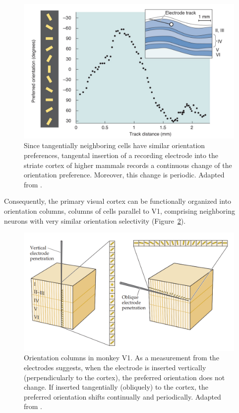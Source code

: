 \begin{figure}[H]\centering
	\includegraphics[width=140mm]{../img/tangengal_electrode_orientation.png}
	\caption{Since tangentially neighboring cells have similar orientation preferences, tangental insertion of a recording electrode into the striate cortex of higher mammals records a continuous change of the orientation preference. Moreover, this change is periodic. Adapted from \citep{bear2020neuroscience}.}
	\label{img_periodic_orientation}
\end{figure}


Consequently, the primary visual cortex can be functionally organized into orientation columns, columns of cells parallel to V1, comprising neighboring neurons with very similar orientation selectivity (Figure~\ref{ori_columns}).


\begin{figure}[H]\centering
	\includegraphics[width=140mm]{../img/orientation_columns.png}
	\caption{Orientation columns in monkey V1. As a measurement from the electrodes suggests, when the electrode is inserted vertically (perpendicularly to the cortex), the preferred orientation does not change. If inserted tangentially (obliquely) to the cortex, the preferred orientation shifts continually and periodically. Adapted from \citep{purves_2019}.}
	\label{ori_columns}
\end{figure}

